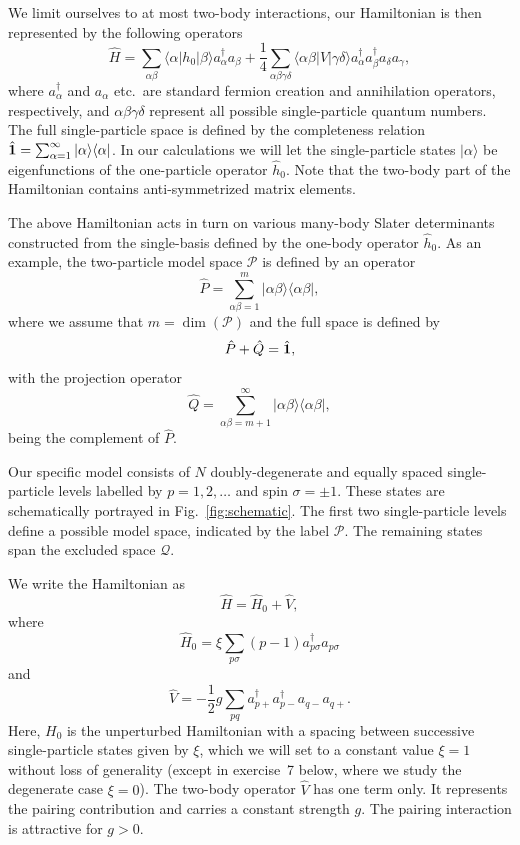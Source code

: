 \documentclass[prc]{revtex4} \usepackage[dvips]{graphicx}
\begin{document}
We limit ourselves to at most two-body interactions, our Hamiltonian
is then represented by the following operators
\[
\hat{H} = \sum_{\alpha\beta}\langle \alpha |h_0|\beta\rangle
a_{\alpha}^{\dagger}a_{\beta}
+\frac{1}{4}\sum_{\alpha\beta\gamma\delta}\langle \alpha\beta|
V|\gamma\delta\rangle
a_{\alpha}^{\dagger}a_{\beta}^{\dagger}a_{\delta}a_{\gamma},
\]
where $a_{\alpha}^{\dagger}$ and $a_{\alpha}$ etc.~are standard
fermion creation and annihilation operators, respectively, and
$\alpha\beta\gamma\delta$ represent all possible single-particle
quantum numbers.  The full single-particle space is defined by the
completeness relation $\hat{{\bf 1}} = \sum_{\alpha
  =1}^{\infty}|\alpha \rangle \langle \alpha|$.  In our calculations
we will let the single-particle states $|\alpha\rangle$ be
eigenfunctions of the one-particle operator $\hat{h}_0$. Note that the two-body part of the Hamiltonian 
contains anti-symmetrized matrix elements.


The above Hamiltonian acts in turn on various many-body Slater
determinants constructed from the single-basis defined by the one-body
operator $\hat{h}_0$.  As an example, the two-particle model space
$\mathcal{P}$ is defined by an operator
\[
\hat{P} = \sum_{\alpha\beta =1}^{m}|\alpha\beta \rangle \langle
\alpha\beta|,
\]
where we assume that $m=\dim(\mathcal{P})$ and the full space is
defined by
\[
\hat{P}+\hat{Q}=\hat{{\bf 1}},
\]
with the projection operator
\[
\hat{Q} = \sum_{\alpha\beta =m+1}^{\infty}|\alpha\beta \rangle \langle
\alpha\beta|,
\]
being the complement of $\hat{P}$.


Our specific model consists of $N$ doubly-degenerate and equally
spaced single-particle levels labelled by $p=1,2,\dots$ and spin
$\sigma=\pm 1$.  These states are schematically portrayed in
Fig.~\ref{fig:schematic}.  The first two single-particle levels define
a possible model space, indicated by the label $\mathcal{P}$.  The
remaining states span the excluded space $\mathcal{Q}$.

We write the Hamiltonian as
\[ \hat{H} = \hat{H}_0 + \hat{V} , \]
where
\[
\hat{H}_0=\xi\sum_{p\sigma}(p-1)a_{p\sigma}^{\dagger}a_{p\sigma}
\]
and
\[
\hat{V}=-\frac{1}{2}g\sum_{pq}a^{\dagger}_{p+}
a^{\dagger}_{p-}a_{q-}a_{q+}.
\]
Here, $H_0$ is the unperturbed Hamiltonian with a spacing between
successive single-particle states given by $\xi$, which we will set to
a constant value $\xi=1$ without loss of generality (except in
exercise~7 below, where we study the degenerate case $\xi=0$). The two-body
operator $\hat{V}$ has one term only. It represents the pairing
contribution and carries a constant strength $g$. The pairing
interaction is attractive for $g>0$.
\end{document}
